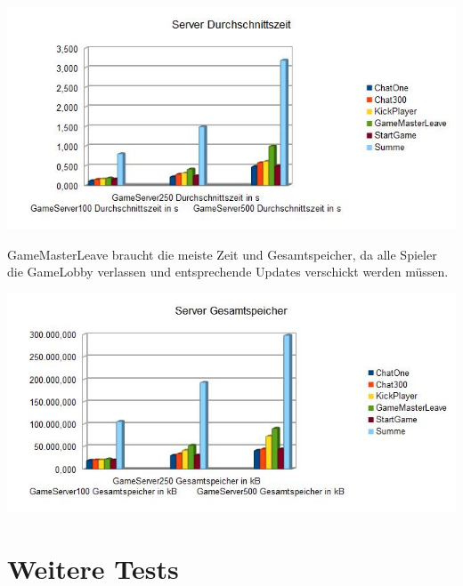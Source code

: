 \documentclass[a4paper]{article}
\begin{document}
\begin{center}
\includegraphics[scale=0.7]{9}
\end{center}
\noindent
GameMasterLeave braucht die meiste Zeit und Gesamtspeicher, da alle Spieler die GameLobby verlassen und entsprechende Updates verschickt werden müssen.

\begin{center}
\includegraphics[scale=0.7]{10}
\end{center}


\section{Weitere Tests}
\end{document}
